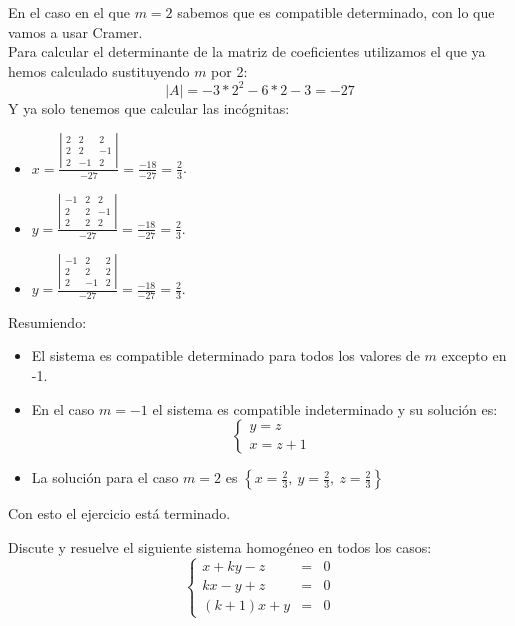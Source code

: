 \documentclass[a4paper,11pt,answers]{exam}
\begin{document}
\begin{questions}
\begin{solution}
En el caso en el que $m=2$ sabemos que es compatible determinado, con lo que vamos a usar Cramer.\\
Para calcular el determinante de la matriz de coeficientes utilizamos el que ya hemos calculado sustituyendo $m$ por 2:
\[|A| = -3*2^2 - 6*2 - 3 = -27\]
Y ya solo tenemos que calcular las incógnitas:
\begin{itemize}
	\item $x = \frac{\left|\begin{array}{rrr}
			2&2&2\\
			2&2&-1\\
			2&-1&2
		\end{array}\right|}{-27} = \frac{-18}{-27} = \frac{2}{3}$.
	\item $y = \frac{\left|\begin{array}{rrr}
			-1&2&2\\
			2&2&-1\\
			2&2&2
		\end{array}\right|}{-27} = \frac{-18}{-27} = \frac{2}{3}$.
	\item $y = \frac{\left|\begin{array}{rrr}
			-1&2&2\\
			2&2&2\\
			2&-1&2
		\end{array}\right|}{-27} = \frac{-18}{-27} = \frac{2}{3}$.
\end{itemize}

Resumiendo:
\begin{itemize}
	\item El sistema es compatible determinado para todos los valores de $m$ excepto en -1.
	\item En el caso $m=-1$ el sistema es compatible indeterminado y su solución es:
	\[\left\lbrace\begin{array}{l}
		y = z\\
		x = z + 1
	\end{array}\right.\]
	\item La solución para el caso $m=2$ es $\left\lbrace
		x=\frac{2}{3},\ 
		y=\frac{2}{3},\ 
		z=\frac{2}{3}\right\rbrace$
\end{itemize}

Con esto el ejercicio está terminado.
\end{solution}

\question Discute y resuelve el siguiente sistema homogéneo en todos los casos:
\[\left\lbrace\begin{array}{lll}
	x +ky -z &=& 0\\
	kx -y +z &=& 0\\
	(k+1)x + y &=& 0
\end{array}
\right.\]


\end{questions}
\end{document}
